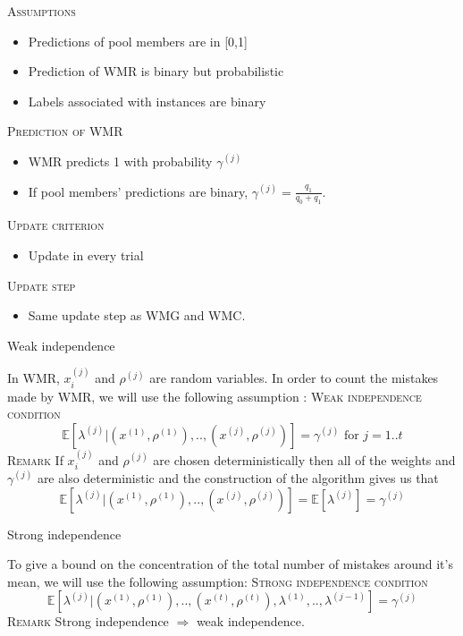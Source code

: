 \documentclass{beamer}
\newcommand{\esp}[1]{\mathbb{E}\!\left[#1\right]}
\begin{document}
\begin{frame}

\textsc{Assumptions}
\begin{itemize}
\item Predictions of pool members are in [0,1]
\item Prediction of WMR is binary but probabilistic
\item Labels associated with instances are binary\newline
\end{itemize}

\textsc{Prediction of WMR}
\begin{itemize}
\item WMR predicts 1 with probability $\gamma^{(j)}$
\item If pool members' predictions are binary, $\gamma^{(j)} = \frac{q_1}{q_0+q_1}$.\newline
\end{itemize}

\textsc{Update criterion}
\begin{itemize}
\item Update in every trial\newline
\end{itemize}

\textsc{Update step}
\begin{itemize}
\item Same update step as WMG and WMC.
\end{itemize}

\end{frame}

\begin{frame}{Weak independence}

In WMR, $x_i^{(j)}$ and $\rho^{(j)}$ are random variables. In order to count the mistakes made by WMR, we will use the following assumption :\newline
\textsc{Weak independence condition}
\[\esp{\lambda^{(j)}|(x^{(1)}, \rho^{(1)}), .., (x^{(j)}, \rho^{(j)})} = \gamma^{(j)}\text{ for }j=1..t\]
\textsc{Remark}
If $x_i^{(j)}$ and $\rho^{(j)}$ are chosen deterministically then all of the weights and $\gamma^{(j)}$ are also deterministic and the construction of the algorithm gives us that 
\[\esp{\lambda^{(j)}|(x^{(1)}, \rho^{(1)}), .., (x^{(j)}, \rho^{(j)})} = \esp{\lambda^{(j)}} = \gamma^{(j)}\]

\end{frame}

\begin{frame}{Strong independence}

To give a bound on the concentration of the total number of mistakes around it's mean, we will use the following assumption:\newline
\textsc{Strong independence condition}
\[\esp{\lambda^{(j)}|(x^{(1)}, \rho^{(1)}), .., (x^{(t)}, \rho^{(t)}), \lambda^{(1)}, .., \lambda^{(j-1)}} = \gamma^{(j)}\]
\textsc{Remark}\newline
Strong independence $\Rightarrow$ weak independence.

\end{frame}
\end{document}
